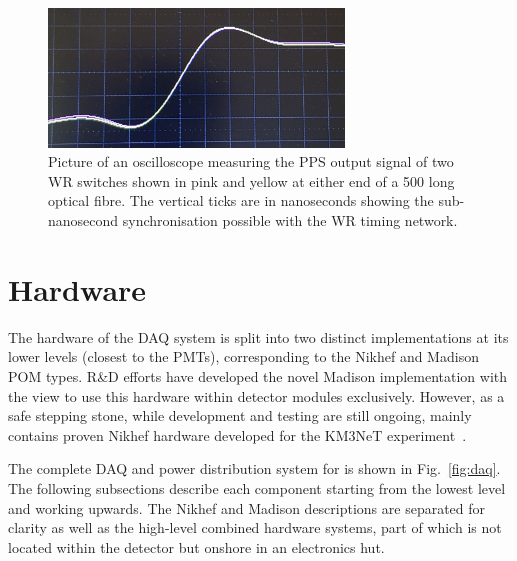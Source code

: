 \begin{figure} %
    \includegraphics[width=0.7\textwidth]{diagrams/5-daq/sync.jpg}
    \caption[Picture of White Rabbit timing synchronisation seen in \chips.]
    {Picture of an oscilloscope measuring the PPS output signal of two WR switches shown in pink
        and yellow at either end of a \unit{500}{} long optical fibre. The vertical
        ticks are in nanoseconds showing the sub-nanosecond synchronisation possible with the WR
        timing network.}
    \label{fig:sync}
\end{figure}

\section{Hardware} %
\label{sec:daq_hard} %

The hardware of the \chipsfive DAQ system is split into two distinct implementations at its lower
levels (closest to the PMTs), corresponding to the Nikhef and Madison POM types. \chips R\&D
efforts have developed the novel Madison implementation with the view to use this hardware within
detector modules exclusively. However, as a safe stepping stone, while development and testing are
still ongoing, \chipsfive mainly contains proven Nikhef hardware developed for the KM3NeT
experiment~\cite{adrian2016}.

The complete DAQ and power distribution system for \chipsfive is shown in Fig.~\ref{fig:daq}. The
following subsections describe each component starting from the lowest level and working upwards.
The Nikhef and Madison descriptions are separated for clarity as well as the high-level combined
hardware systems, part of which is not located within the detector but onshore in an electronics
hut.

